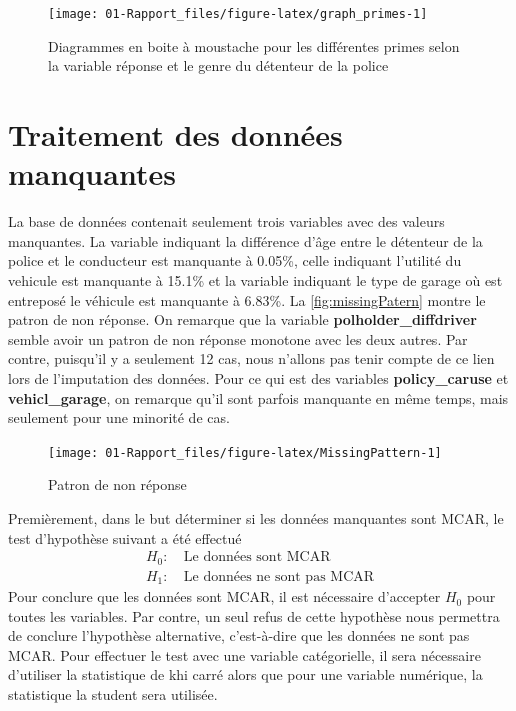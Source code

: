 \documentclass[
]{article}
\begin{document}
\begin{figure}

{\centering \texttt{[image: 01-Rapport\_files/figure-latex/graph\_primes-1]} 

}

\caption{\label{fig:BoitesMoustache}Diagrammes en boite à moustache pour les différentes primes selon la variable réponse et le genre du détenteur de la police}\label{fig:graph_primes}
\end{figure}

\newpage

\hypertarget{traitement-des-donnuxe9es-manquantes}{%
\section{Traitement des données
manquantes}\label{traitement-des-donnuxe9es-manquantes}}

La base de données contenait seulement trois variables avec des valeurs
manquantes. La variable indiquant la différence d'âge entre le détenteur
de la police et le conducteur est manquante à 0.05\%, celle indiquant
l'utilité du vehicule est manquante à 15.1\% et la variable indiquant le
type de garage où est entreposé le véhicule est manquante à 6.83\%. La
\autoref{fig:missingPatern} montre le patron de non réponse. On remarque
que la variable \textbf{polholder\_diffdriver} semble avoir un patron de
non réponse monotone avec les deux autres. Par contre, puisqu'il y a
seulement 12 cas, nous n'allons pas tenir compte de ce lien lors de
l'imputation des données. Pour ce qui est des variables
\textbf{policy\_caruse} et \textbf{vehicl\_garage}, on remarque qu'il
sont parfois manquante en même temps, mais seulement pour une minorité
de cas.

\begin{figure}

{\centering \texttt{[image: 01-Rapport\_files/figure-latex/MissingPattern-1]} 

}

\caption{\label{fig:missingPatern}Patron de non réponse}\label{fig:MissingPattern}
\end{figure}

Premièrement, dans le but déterminer si les données manquantes sont
MCAR, le test d'hypothèse suivant a été effectué \begin{align*}
  H_0:&\: \text{Le données sont MCAR} \\
  H_1:&\: \text{Le données ne sont pas MCAR}
\end{align*} Pour conclure que les données sont MCAR, il est nécessaire
d'accepter \(H_0\) pour toutes les variables. Par contre, un seul refus
de cette hypothèse nous permettra de conclure l'hypothèse alternative,
c'est-à-dire que les données ne sont pas MCAR. Pour effectuer le test
avec une variable catégorielle, il sera nécessaire d'utiliser la
statistique de khi carré alors que pour une variable numérique, la
statistique la student sera utilisée.
\end{document}
